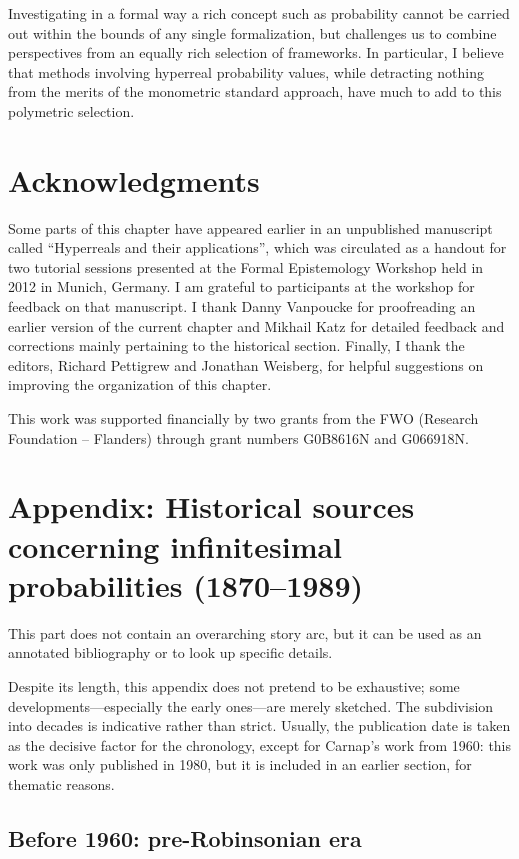 Investigating in a formal way a rich concept such as probability cannot be carried out within the bounds of any single formalization, but challenges us to combine perspectives from an equally rich selection of frameworks. In particular, I believe that methods involving hyperreal probability values, while detracting nothing from the merits of the monometric standard approach, have much to add to this polymetric selection.

\newpage
\section*{Acknowledgments}
Some parts of this chapter have appeared earlier in an un\-pub\-lished man\-u\-script called ``Hyperreals and their applications'', which was circulated as a handout for two tutorial sessions presented at the Formal Epistemology Workshop held in 2012 in Munich, Germany. I am grateful to participants at the workshop for feedback on that manuscript.
I thank Danny Vanpoucke for proofreading an earlier version of the current chapter and Mikhail Katz for detailed feedback and corrections mainly pertaining to the historical section. Finally, I thank the editors, Richard Pettigrew and Jonathan Weisberg, for helpful suggestions on improving the organization of this chapter.

This work was supported financially by two grants from the FWO (Research Foundation -- Flanders) through grant numbers G0B8616N and G066918N.

\newpage
\setcounter{secnumdepth}{3}
\appendix
\section{Appendix: Historical sources concerning infinitesimal probabilities (1870--1989)}
This part does not contain an overarching story arc, but it can be used as an annotated bibliography or to look up specific details.

Despite its length, this appendix does not pretend to be exhaustive; some developments---especially the early ones---are merely sketched.
The subdivision into decades is indicative rather than strict. Usually, the publication date is taken as the decisive factor for the chronology, except for Carnap's work from 1960: this work was only published in 1980, but it is included in an earlier section, for thematic reasons.

\subsection{Before 1960: pre-Robinsonian era}

